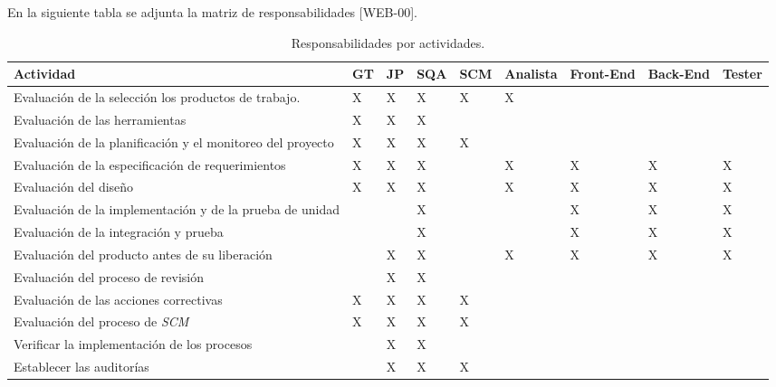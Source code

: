 En la siguiente tabla se adjunta la matriz de responsabilidades [WEB-00].

\begin{table}[H]
    \caption[Responsabilidades por actividades.] {Responsabilidades por actividades.}
    \label{tbl:responsabilidades por actividades}
    \begin{tabular}{|p{}|p{}|p{}|p{}|p{}|p{}|p{}|p{}|p{}|}
        \hline
        \textbf{Actividad} &  \textbf{GT} & \textbf{JP} & \textbf{SQA} & \textbf{SCM} & \textbf{Analista} & \textbf{Front-End} & \textbf{Back-End} & \textbf{Tester}\\
    	\hline
    	\hline
    	Evaluación	de la selección los productos de trabajo. & X & X & X & X & X & & & \\ \hline
    	Evaluación de las herramientas & X & X & X & & & & & \\ \hline
    	Evaluación de la planificación y el monitoreo del proyecto & X & X & X & X & & & & \\ \hline
    	Evaluación de la especificación de requerimientos & X & X & X & & X & X & X & X \\ \hline
    	Evaluación del diseño & X & X & X & & X & X & X & X \\ \hline
    	Evaluación de la implementación y de la prueba de unidad & & & X & & & X & X & X \\ \hline
    	Evaluación de la integración y prueba & & & X & & & X & X & X \\ \hline
    	Evaluación del producto antes de su liberación & & X & X & & X & X & X & X \\ \hline
    	Evaluación del proceso de revisión & & X & X & & & & & \\ \hline
    	Evaluación de las acciones correctivas & X & X & X & X & & & & \\ \hline
    	Evaluación del proceso de \emph{SCM} & X & X & X & X & & & & \\ \hline
    	Verificar la implementación de los procesos & & X & X & & & & & \\ \hline
    	Establecer las auditorías & & X & X & X & & & & \\ \hline
    	
    \end{tabular}
\end{table}















	



